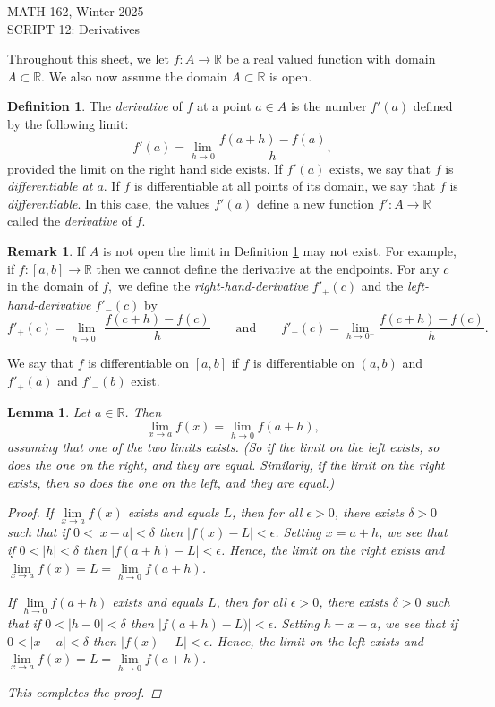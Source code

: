 \documentclass[11pt]{article}
\newcommand{\bbR}{\mathbb{R}}
\renewcommand{\_}[1]{\underline{ #1 }}
\newcommand{\head}[1]{
	\begin{center}
		{\large #1}
		\vspace{.2 in}
	\end{center}
	
	\bigskip 
}
\newtheorem{lemma}[theorem]{Lemma}
\theoremstyle{definition}
\newtheorem{definition}[theorem]{Definition}
\newtheorem{remark}[theorem]{Remark}
\numberwithin{equation}{subsection}
\begin{document}
	
\head{MATH 162, Winter 2025\\
SCRIPT 12: Derivatives}

\setcounter{section}{12} 


Throughout this sheet, we let $f\colon A \to \bbR$ be a real valued function with domain $A \subset \bbR$. We also now assume the domain $A \subset \bbR$ is open. 
\begin{definition}\label{deriv}
	The \emph{derivative} of $f$ at a point $a \in A$ is the number $f'(a)$ defined by the following limit:
	\[
		f'(a) = \lim_{h \to 0} \frac{f(a + h) - f(a)}{h}, 
	\]
	provided the limit on the right hand side exists.
	If $f'(a)$ exists, we say that $f$ is \emph{differentiable at $a$}. If $f$ is differentiable at all points of its domain, we say that $f$ is \emph{differentiable}. In this case, the values $f'(a)$ define a new function $f'\colon A \to \bbR$ called the \emph{derivative} of $f$.
\end{definition}

\begin{remark} If $A$ is not open the limit in Definition \ref{deriv} may not exist. For example, if $f\colon [a,b]\to \bbR$ then we cannot define the derivative at the endpoints. 
 For any $c$ in the domain of $f,$ we define the {\em right-hand-derivative} $f'_{+}(c)$ and the {\em left-hand-derivative} $f'_{-}(c)$  by
$$f'_{+}(c)=\lim_{h\to 0^+} \frac{f(c+h)-f(c)}{h}\qquad \text{and} \qquad f'_{-}(c)= \lim_{h\to 0^{-}}\frac{f(c+h)-f(c)}{h}.$$

 We say that $f$ is differentiable on $[a,b]$ if $f$ is differentiable on $(a,b)$ and $f'_{+}(a)$ and  $f'_{-}(b)$ exist. 
\end{remark}

\begin{lemma}
	Let $a \in \bbR$. Then 
	\[
		\lim\limits_{x \to a}f(x) = \lim\limits_{h \to 0}f(a + h),
	\]
	assuming that one of the two limits exists. (So if the limit on the left exists, so does the one on the right, and they are equal. Similarly, if the limit on the right exists, then so does the one on the left, and they are equal.)


\begin{proof}
If $\lim\limits_{x \to a}f(x)$ exists and equals $L$, then for all $\epsilon>0$, there exists $\delta>0$ such that if $0<|x-a|<\delta$ then $|f(x)-L|<\epsilon$. Setting $x=a+h$, we see that if $0<|h|<\delta$ then $|f(a+h)-L|<\epsilon$. Hence, the limit on the right exists and $\lim\limits_{x \to a}f(x)=L=\lim\limits_{h \to 0}f(a + h)$.

If $\lim\limits_{h \to 0}f(a + h)$ exists and equals $L$, then for all $\epsilon>0$, there exists $\delta>0$ such that if $0<|h-0|<\delta$ then $|f(a+h)-L)|<\epsilon$. Setting $h=x-a$, we see that if $0<|x-a|<\delta$ then $|f(x)-L|<\epsilon$. Hence, the limit on the left exists and $\lim\limits_{x \to a}f(x)=L=\lim\limits_{h \to 0}f(a + h)$.

This completes the proof.

\renewcommand\qedsymbol{QED}
\end{proof}


\end{lemma} 
\end{document}
